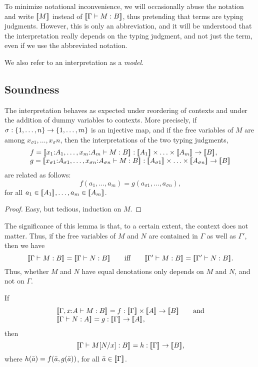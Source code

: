 \documentclass{article}
\begin{document}
To minimize notational inconvenience, we will occasionally abuse the
notation and write $[\![M]\!]_{}$ instead of $[\![\Gamma\vdash M:B]\!]_{}$, thus
pretending that terms are typing judgments. However, this is only an
abbreviation, and it will be understood that the interpretation really
depends on the typing judgment, and not just the term, even if we use
the abbreviated notation.

We also refer to an interpretation as a {\em model}.

\subsection{Soundness}

\begin{lemma}\label{lem-context-set}
  The interpretation behaves as expected under reordering of contexts
  and under the addition of dummy variables to contexts. More
  precisely, if $\sigma:\{1,\ldots,n\}\to\{1,\ldots,m\}$ is an
  injective map, and if the free variables of $M$ are among
  $x_{\sigma 1},\ldots,x_\sigma n$, then the interpretations of the
  two typing judgments,
  \[ \begin{array}{l}
    f = \semm{\typ{x_1}{A_1},\ldots,\typ{x_m}{A_m}\tj M:B}
    : \semm{A_1}\times\ldots\times\semm{A_m} \to \semm{B}, \\
    g = \semm{\typ{x_{\sigma 1}}{A_{\sigma 1}},\ldots,
      \typ{x_{\sigma n}}{A_{\sigma n}} \tj M:B} 
    : \semm{A_{\sigma 1}}\times\ldots\times\semm{A_{\sigma n}} \to \semm{B}
  \end{array}
  \]
  are related as follows:
  \[  f(a_1,\ldots,a_m) = g(a_{\sigma 1},\ldots,a_{\sigma n}),
  \]
  for all $a_1\in[\![A_1]\!]_{},\ldots,a_m\in[\![A_m]\!]_{}$.
\end{lemma}

\begin{proof}
  Easy, but tedious, induction on $M$.\eot
\end{proof}

The significance of this lemma is that, to a certain extent, the
context does not matter. Thus, if the free variables of $M$ and $N$
are contained in $\Gamma$ as well as $\Gamma'$, then we have 
\[ \semm{\Gamma\tj M:B}=\semm{\Gamma\tj N:B} \sep\mbox{iff}\sep
 \semm{\Gamma'\tj M:B}=\semm{\Gamma'\tj N:B}.
\]
Thus, whether $M$ and $N$ have equal denotations only depends on $M$
and $N$, and not on $\Gamma$.

\begin{lemma}
  If 
  \[ \begin{array}{l}
    \semm{\Gamma,\typ{x}{A}\tj M:B} = f 
    : \semm{\Gamma}\times\semm{A}\to\semm{B}\sep\mbox{and}\\
    \semm{\Gamma\tj N:A} = g
    : \semm{\Gamma}\to\semm{A},
  \end{array}
  \]
  then
  \[ [\![\Gamma\vdash M[N/x]:B]\!]_{} = h
  : [\![\Gamma]\!]_{}\to[\![B]\!]_{},
  \]
  where $h(\bar a) = f(\bar a,g(\bar a))$, for all
  $\bar a\in[\![\Gamma]\!]_{}$.
\end{lemma}
\end{document}
